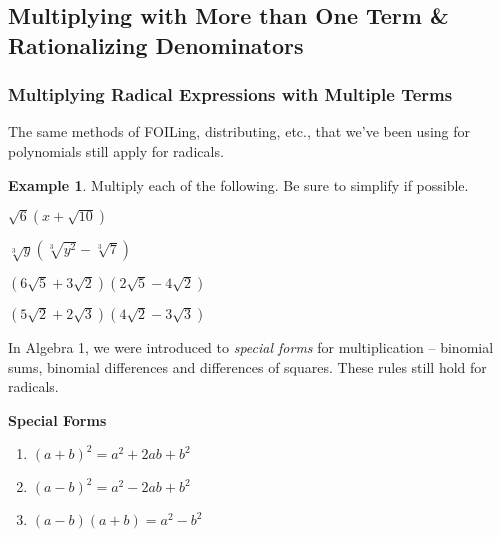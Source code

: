 \documentclass[addpoints,12pt]{exam}
\theoremstyle{definition}
\newtheorem{example}{Example}[subsection]
\begin{document}
\setcounter{section}{10}
\setcounter{subsection}{4}

\subsection{Multiplying with More than One Term \& Rationalizing Denominators}

\subsubsection*{Multiplying Radical Expressions with Multiple Terms}

The same methods of FOILing, distributing, etc., that we've been using for polynomials still apply for radicals.
\vspace{.25in}
\begin{example}
Multiply each of the following. Be sure to simplify if possible.
\begin{enumerate}
\begin{minipage}{.5\textwidth}
\item $\sqrt{6}\left(x+\sqrt{10}\right)$
\vspace{1.5in}
\item $\sqrt[3]{y}\left(\sqrt[3]{y^2} - \sqrt[3]{7}\right)$
\vspace{1.5in}
\end{minipage}%
\begin{minipage}{.5\textwidth}
\item $\left(6\sqrt{5}+3\sqrt{2}\right)\left(2\sqrt{5}-4\sqrt{2}\right)$
\vspace{1.5in}
\item $\left(5\sqrt{2}+2\sqrt{3}\right)\left(4\sqrt{2}-3\sqrt{3}\right)$
\vspace{1.5in}
\end{minipage}%
\end{enumerate}
\end{example}
In Algebra 1, we were introduced to \emph{special forms} for multiplication -- binomial sums, binomial differences and differences of squares. These rules still hold for radicals.

\begin{mdframed}
\textbf{Special Forms}
\begin{enumerate}
\item $(a+b)^2 = a^2 + 2ab + b^2$
\item $(a-b)^2 = a^2 - 2ab + b^2$
\item $(a-b)(a+b) = a^2 - b^2$
\end{enumerate}
\end{mdframed}
\end{document}
